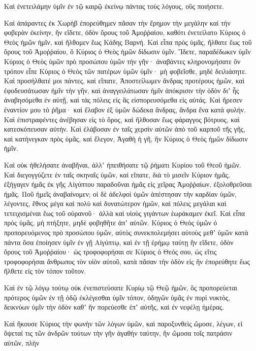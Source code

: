 {Καὶ ἐνετειλάμην ὑμῖν ἐν τῷ καιρῷ ἐκείνῳ πάντας τοὺς λόγους, οὓς ποιήσετε.
\par }{\PP {}Καὶ ἀπάραντες ἐκ Χωρὴβ ἐπορεύθημεν πᾶσαν τὴν ἔρημον τὴν μεγάλην καὶ τὴν φοβερὰν ἐκείνην, ἣν εἴδετε, ὁδὸν ὄρους τοῦ Ἀμοῤῥαίου, καθότι ἐνετείλατο Κύριος ὁ Θεὸς ἡμῶν ἡμῖν, καὶ ἤλθομεν ἕως Κάδης Βαρνή.
Καὶ εἶπα πρὸς ὑμᾶς, ἤλθατε ἕως τοῦ ὄρους τοῦ Ἀμοῤῥαίου, ὃ Κύριος ὁ Θεὸς ἡμῶν δίδωσιν ὑμῖν.
Ἴδετε, παραδέδωκεν ὑμῖν Κύριος ὁ Θεὸς ὑμῶν πρὸ προσώπου ὑμῶν τὴν γῆν· ἀναβάντες κληρονομήσατε ὃν τρόπον εἶπε Κύριος ὁ Θεὸς τῶν πατέρων ὑμῶν ὑμῖν· μὴ φοβεῖσθε, μηδὲ δειλιάσητε.
Καὶ προσήλθατέ μοι πάντες, καὶ εἴπατε, Ἀποστείλωμεν ἄνδρας προτέρους ἡμῶν, καὶ ἐφοδευσάτωσαν ἡμῖν τὴν γῆν, καὶ ἀναγγειλάτωσαν ἡμῖν ἀπόκρισιν τὴν ὁδὸν διʼ ἧς ἀναβησόμεθα ἐν αὐτῇ, καὶ τὰς πόλεις εἰς ἃς εἰσπορευσόμεθα εἰς αὐτάς.
Καὶ ἤρεσεν ἐναντίον μου τὸ ῥῆμα· καὶ ἔλαβον ἐξ ὑμῶν δώδεκα ἄνδρας, ἄνδρα ἕνα κατά φυλήν.
Καὶ ἐπιστραφέντες ἀνέβησαν εἰς τὸ ὄρος, καὶ ἤλθοσαν ἕως φάραγγος βότρυος, καὶ κατεσκόπευσαν αὐτήν.
Καὶ ἐλάβοσαν ἐν ταῖς χερσὶν αὐτῶν ἀπὸ τοῦ καρποῦ τῆς γῆς, καὶ κατήνεγκαν πρὸς ὑμᾶς, καὶ ἔλεγον, Ἀγαθὴ ἡ γῆ, ἣν Κύριος ὁ Θεὸς ἡμῶν δίδωσιν ἡμῖν.
\par }{\PP {}Καὶ οὐκ ἠθελήσατε ἀναβῆναι, ἀλλʼ ἠπειθήσατε τῷ ῥήματι Κυρίου τοῦ Θεοῦ ἡμῶν.
Καὶ διεγογγύζετε ἐν ταῖς σκηναῖς ὑμῶν, καὶ εἴπατε, διὰ τὸ μισεῖν Κύριον ἡμᾶς, ἐξήγαγεν ἡμᾶς ἐκ γῆς Αἰγύπτου παραδοῦναι ἡμᾶς εἰς χεῖρας Ἀμοῤῥαίων, ἐξολοθρεῦσαι ἡμᾶς.
Ποῦ ἡμεῖς ἀναβαίνομεν; οἱ δὲ ἀδελφοὶ ὑμῶν ἀπέστησαν τὴν καρδίαν ὑμῶν, λέγοντες, ἔθνος μέγα καὶ πολὺ καὶ δυνατώτερον ἡμῶν, καὶ πόλεις μεγάλαι καὶ τετειχισμέναι ἕως τοῦ οὐρανοῦ· ἀλλὰ καὶ υἱοὺς γιγάντων ἑωράκαμεν ἐκεῖ.
Καὶ εἶπα πρὸς ὑμᾶς, μὴ πτήξητε, μηδὲ φοβηθῆτε ἀπʼ αὐτῶν.
Κύριος ὁ Θεὸς ὑμῶν ὁ προπορευόμενος πρὸ προσώπου ὑμῶν, αὐτὸς συνεκπολεμήσει αὐτοὺς μεθʼ ὑμῶν κατὰ πάντα ὅσα ἐποίησεν ὑμῖν ἐν γῇ Αἰγύπτῳ, καὶ ἐν τῇ ἐρήμῳ ταύτῃ ἣν εἴδετε, ὁδὸν ὄρους τοῦ Ἀμοῤῥαίου· ὡς τροφοφορήσαι σε Κύριος ὁ
Θεός σου, ὡς εἴτις τροφοφορήσαι ἄνθρωπος τὸν υἱὸν αὐτοῦ, κατὰ πᾶσαν τὴν ὁδὸν εἰς ἣν ἐπορεύθητε ἕως ῆλθετε εἰς τὸν τόπον τοῦτον.
\par }{\PP {}Καὶ ἐν τῷ λόγῳ τούτῳ οὐκ ἐνεπιστεύσατε Κυρίῳ τῷ Θεῷ ἡμῶν,
ὃς προπορεύεται πρότερος ὑμῶν ἐν τῇ ὁδῷ ἐκλέγεσθαι ὑμῖν τόπον, ὁδηγῶν ὑμᾶς ἐν πυρὶ νυκτὸς, δεικνύων ὑμῖν τὴν ὁδὸν καθʼ ἣν πορεύεσθε ἐπʼ αὐτῆς, καὶ ἐν νεφέλῃ ἡμέρας.
\par }{\PP {}Καὶ ἤκουσε Κύριος τὴν φωνὴν τῶν λόγων ὑμῶν, καὶ παροξυνθεὶς ὤμοσε, λέγων,
εἰ ὄψεταί τις τῶν ἀνδρῶν τούτων τὴν γῆν ἀγαθὴν ταύτην, ἣν ὤμοσα τοῖς πατράσιν αὐτῶν, πλὴν
}
